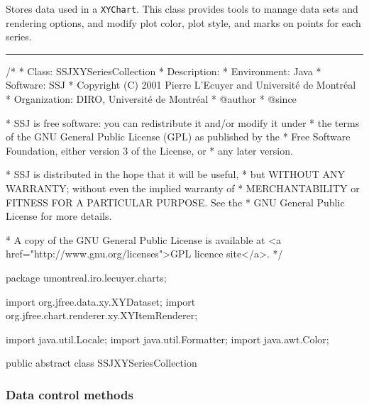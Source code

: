 
Stores data used in a \texttt{XYChart}.
This class provides tools to manage data sets and rendering options, and modify
plot color, plot style, and marks on points for each series.

\bigskip\hrule
\begin{code}
\begin{hide}
/*
 * Class:        SSJXYSeriesCollection
 * Description:  
 * Environment:  Java
 * Software:     SSJ 
 * Copyright (C) 2001  Pierre L'Ecuyer and Université de Montréal
 * Organization: DIRO, Université de Montréal
 * @author       
 * @since

 * SSJ is free software: you can redistribute it and/or modify it under
 * the terms of the GNU General Public License (GPL) as published by the
 * Free Software Foundation, either version 3 of the License, or
 * any later version.

 * SSJ is distributed in the hope that it will be useful,
 * but WITHOUT ANY WARRANTY; without even the implied warranty of
 * MERCHANTABILITY or FITNESS FOR A PARTICULAR PURPOSE.  See the
 * GNU General Public License for more details.

 * A copy of the GNU General Public License is available at
   <a href="http://www.gnu.org/licenses">GPL licence site</a>.
 */
\end{hide}
package umontreal.iro.lecuyer.charts;\begin{hide}

import   org.jfree.data.xy.XYDataset;
import   org.jfree.chart.renderer.xy.XYItemRenderer;

import   java.util.Locale;
import   java.util.Formatter;
import   java.awt.Color;\end{hide}

public abstract class SSJXYSeriesCollection \begin{hide} {
   protected XYItemRenderer renderer;
   protected XYDataset seriesCollection;
\end{hide}
\end{code}

\subsubsection*{Data control methods}

